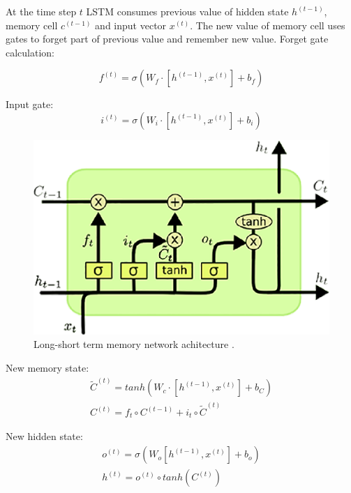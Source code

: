 At the time step $t$ LSTM consumes previous value of hidden state $h^{(t-1)}$, memory cell $c^{(t-1)}$ and input vector $x^{(t)}$. The new value of memory cell uses gates to forget part of previous value and remember new value. Forget gate calculation:

\begin{equation}
f^{(t)} = \sigma(W_f\cdot[h^{(t-1)},x^{(t)}] + b_f)
\label{lstm:ft}
\end{equation} 

Input gate:
\begin{equation}
i^{(t)}=\sigma(W_i\cdot[h^{(t-1)}, x^{(t)}]+b_i)
\label{lstm:input}
\end{equation} 

\begin{figure}[h]
\centering
\includegraphics{Figures/lstm}
\decoRule
\caption[Long-short term memory]{Long-short term memory network achitecture \parencite{lstm-picture}.}
\label{fig:word_embeddings}
\end{figure}

New memory state:
\begin{equation}
\begin{gathered}
\widetilde{C}^{(t)} = tanh(W_c\cdot[h^{(t-1)}, x^{(t)}]+b_C) \\

C^{(t)} = f_t\circ C^{(t-1)}+i_t\circ\widetilde{C}^{(t)}
\end{gathered}
\label{lstm:c}
\end{equation} 

New hidden state:
\begin{equation}
\begin{gathered}
o^{(t)}=\sigma(W_o[h^{(t-1)},x^{(t)}]+b_o) \\

h^{(t)}=o^{(t)}\circ tanh(C^{(t)})
\end{gathered}
\label{lstm:h}
\end{equation} 

